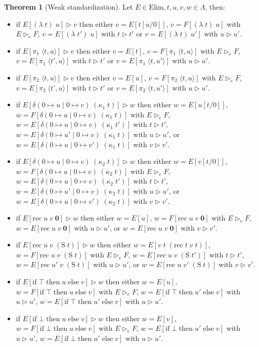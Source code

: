 \documentclass{article}
\newcommand{\ife}[3]{\mathrm{if}\;#1\;\mathrm{then}\;#2\;\mathrm{else}\;#3}
\newcommand{\bO}[0]{\boldsymbol{0}}
\newcommand{\Ss}[0]{\mathrm{S}}
\newcommand{\rec}[0]{\mathrm{rec}}
\newcommand{\Tt}[0]{\top}
\newcommand{\Ff}[0]{\bot}
\newcommand{\deltacase}[3]{\delta(0\mapsto #1\mid 0 \mapsto #2)\;#3}
\newcommand{\Elim}[0]{\mathrm{Elim}}
\theoremstyle{definition}
\newtheorem{them}{Theorem}
\begin{document}
\begin{them}[Weak standardization]
    Let $E\in\Elim, t,u,v,w\in\Lambda$, then:
    \begin{itemize}
        \item if $E[(\lambda\;t)\;u]\rhd v$ then either $v = E[t[u/0]]$, $v = F[(\lambda\;t)\;u]$ with
        $E\rhd_e F$, $v = E[(\lambda\;t')\;u]$ with $t \rhd t'$ or $v = E[(\lambda\;t)\;u']$ with $u\rhd u'$.
        \item if $E[\pi_1\;\langle t,u\rangle]\rhd v$ then either $v = E[t]$,
        $v = F[\pi_1\;\langle t,u\rangle]$ with $E \rhd_e F$, $v = E[\pi_1\;\langle t',u\rangle]$ with
        $t \rhd t'$ or $v = E[\pi_1\;\langle t,u'\rangle]$ with $u \rhd u'$.
        \item if $E[\pi_2\;\langle t,u\rangle]\rhd v$ then either $v = E[u]$,
        $v = F[\pi_2\;\langle t,u\rangle]$ with $E \rhd_e F$, $v = E[\pi_2\;\langle t',u\rangle]$ with
        $t \rhd t'$ or $v = E[\pi_2\;\langle t,u'\rangle]$ with $u \rhd u'$.
        \item if $E[\deltacase{u}{v}{(\kappa_1\;t)}]\rhd w$ then either $w = E[u[t/0]]$,
        $w = F[\deltacase{u}{v}{(\kappa_1\;t)}]$ with $E \rhd_e F$,
        $w = E[\deltacase{u}{v}{(\kappa_1\;t')}]$ with
        $t \rhd t'$, $w = E[\deltacase{u'}{v}{(\kappa_1\;t)}]$ with $u \rhd u'$, or
        $w = E[\deltacase{u}{v'}{(\kappa_1\;t)}]$ with $v \rhd v'$.
        \item if $E[\deltacase{u}{v}{(\kappa_2\;t)}]\rhd w$ then either $w = E[v[t/0]]$,
        $w = F[\deltacase{u}{v}{(\kappa_2\;t)}]$ with $E \rhd_e F$,
        $w = E[\deltacase{u}{v}{(\kappa_2\;t')}]$ with
        $t \rhd t'$, $w = E[\deltacase{u'}{v}{(\kappa_2\;t)}]$ with $u \rhd u'$, or
        $w = E[\deltacase{u}{v'}{(\kappa_2\;t)}]$ with $v \rhd v'$.
        \item if $E[\rec\;{u}\;{v}\;\bO]\rhd w$ then either $w = E[u]$,
        $w = F[\rec\;{u}\;{v}\;\bO]$ with $E \rhd_e F$,
        $w = E[\rec\;{u}\;{v}\;\bO]$ with $u \rhd u'$, or
        $w = E[\rec\;{u}\;{v}\;\bO]$ with $v \rhd v'$.
        \item if $E[\rec\;{u}\;{v}\;(\Ss\;t)]\rhd w$ then either $w = E[v\;t\;(\rec\;t\;v\;t)]$,
        $w = F[\rec\;{u}\;{v}\;(\Ss\;t)]$ with $E \rhd_e F$,
        $w = E[\rec\;{u}\;{v}\;(\Ss\;t')]$ with $t \rhd t'$,
        $w = E[\rec\;{u'}\;{v}\;(\Ss\;t)]$ with $u \rhd u'$, or
        $w = E[\rec\;{u}\;{v'}\;(\Ss\;t)]$ with $v \rhd v'$.
        \item if $E[\ife{\Tt}{u}{v}] \rhd w$ then either $w = E[u]$,
        $w = F[\ife{\Tt}{u}{v}]$ with $E \rhd_e F$,
        $w = E[\ife{\Tt}{u'}{v}]$ with $u \rhd u'$,
        $w = E[\ife{\Tt}{u'}{v}]$ with $u \rhd u'$.
        \item if $E[\ife{\Ff}{u}{v}] \rhd w$ then either $w = E[v]$,
        $w = F[\ife{\Ff}{u}{v}]$ with $E \rhd_e F$,
        $w = E[\ife{\Ff}{u'}{v}]$ with $u \rhd u'$,
        $w = E[\ife{\Ff}{u'}{v}]$ with $u \rhd u'$.
    \end{itemize}
\end{them}
\end{document}
